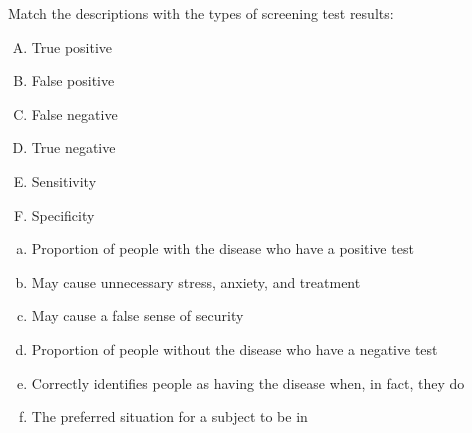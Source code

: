 
Match the descriptions with the types of screening
test results:
\begin{enumerate}[A.]
\item True positive 
\item False positive
\item False negative
\item True negative
\item Sensitivity
\item Specificity
\end{enumerate}

\begin{enumerate}[(a)]
\item Proportion of people with the disease who have a positive test 
\item May cause unnecessary stress, anxiety, and treatment 
\item May cause a false sense of security 
\item Proportion of people without the disease who have a negative 
test 
\item Correctly identifies people as having the disease when, in fact,
they do  
\item The preferred situation for a subject to be in  
\end{enumerate}

